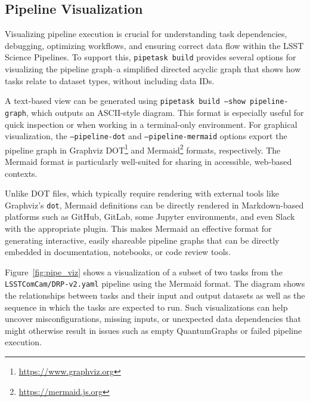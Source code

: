 \subsection{Pipeline Visualization}
\label{sec:pipeline_visualization}

Visualizing pipeline execution is crucial for understanding task dependencies, debugging, optimizing workflows, and ensuring correct data flow within the LSST Science Pipelines.
To support this, \texttt{pipetask build} provides several options for visualizing the pipeline graph--a simplified directed acyclic graph that shows how tasks relate to dataset types, without including data IDs.

A text-based view can be generated using \texttt{pipetask build --show pipeline-graph}, which outputs an ASCII-style diagram.
This format is especially useful for quick inspection or when working in a terminal-only environment.
For graphical visualization, the \texttt{--pipeline-dot} and \texttt{--pipeline-mermaid} options export the pipeline graph in Graphviz DOT\footnote{\url{https://www.graphviz.org}} and Mermaid\footnote{\url{https://mermaid.js.org}} formats, respectively.
The Mermaid format is particularly well-suited for sharing in accessible, web-based contexts.

Unlike DOT files, which typically require rendering with external tools like Graphviz's \texttt{dot}, Mermaid definitions can be directly rendered in Markdown-based platforms such as GitHub, GitLab, some Jupyter environments, and even Slack with the appropriate plugin.
This makes Mermaid an effective format for generating interactive, easily shareable pipeline graphs that can be directly embedded in documentation, notebooks, or code review tools.

Figure~\ref{fig:pipe_viz} shows a visualization of a subset of two tasks from the \texttt{LSSTComCam/DRP-v2.yaml} pipeline using the Mermaid format.
The diagram shows the relationships between tasks and their input and output datasets as well as the sequence in which the tasks are expected to run.
Such visualizations can help uncover misconfigurations, missing inputs, or unexpected data dependencies that might otherwise result in issues such as empty QuantumGraphs or failed pipeline execution.

